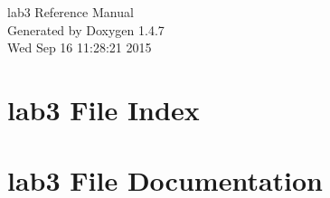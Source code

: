 \documentclass[a4paper]{book}
\begin{document}
\begin{titlepage}
\vspace*{7cm}
\begin{center}
{\Large lab3 Reference Manual}\\
\vspace*{1cm}
{\large Generated by Doxygen 1.4.7}\\
\vspace*{0.5cm}
{\small Wed Sep 16 11:28:21 2015}\\
\end{center}
\end{titlepage}
\clearemptydoublepage
{}
\tableofcontents
\clearemptydoublepage
{}
\chapter{lab3 File Index}

\chapter{lab3 File Documentation}



\printindex
\end{document}
